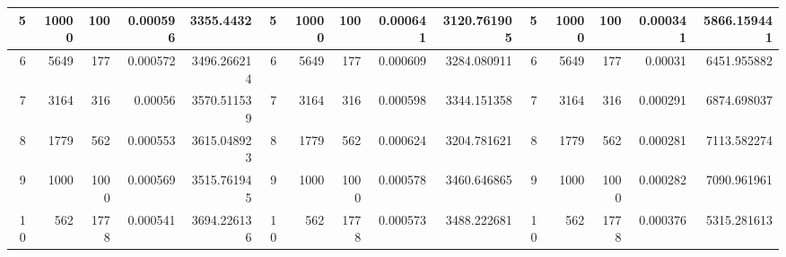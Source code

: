 \begin{table}[htbp]
\begin{tabular}{|r|r|r|r|r|r|r|r|r|r|r|r|r|r|r|}
		\midrule
		5                                 & 10000                           & 100                             & 0.000596                           & 3355.4432                            & 5                                & 10000                           & 100                             & 0.000641                           & 3120.761905                          & 5  & 10000 & 100     & 0.000341 & 5866.159441 \\
		\midrule
		6                                 & 5649                            & 177                             & 0.000572                           & 3496.266214                          & 6                                & 5649                            & 177                             & 0.000609                           & 3284.080911                          & 6  & 5649  & 177     & 0.00031  & 6451.955882 \\
		\midrule
		7                                 & 3164                            & 316                             & 0.00056                            & 3570.511539                          & 7                                & 3164                            & 316                             & 0.000598                           & 3344.151358                          & 7  & 3164  & 316     & 0.000291 & 6874.698037 \\
		\midrule
		8                                 & 1779                            & 562                             & 0.000553                           & 3615.048923                          & 8                                & 1779                            & 562                             & 0.000624                           & 3204.781621                          & 8  & 1779  & 562     & 0.000281 & 7113.582274 \\
		\midrule
		9                                 & 1000                            & 1000                            & 0.000569                           & 3515.761945                          & 9                                & 1000                            & 1000                            & 0.000578                           & 3460.646865                          & 9  & 1000  & 1000    & 0.000282 & 7090.961961 \\
		\midrule
		10                                & 562                             & 1778                            & 0.000541                           & 3694.226136                          & 10                               & 562                             & 1778                            & 0.000573                           & 3488.222681                          & 10 & 562   & 1778    & 0.000376 & 5315.281613 \\

\end{tabular}
\end{table}
